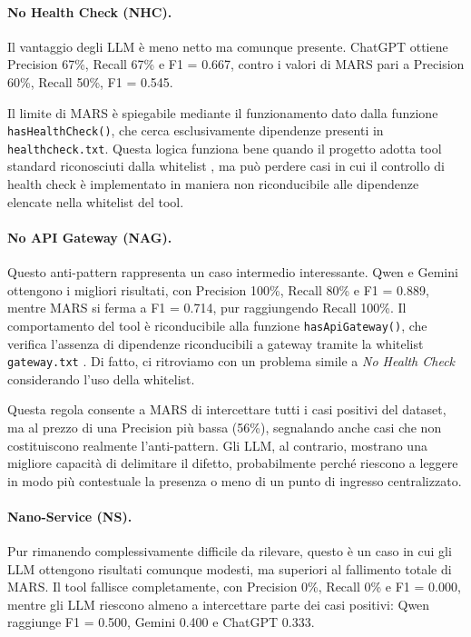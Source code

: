 \paragraph{No Health Check (NHC).}
Il vantaggio degli LLM è meno netto ma comunque presente. ChatGPT ottiene Precision 67\%, Recall 67\% e F1 = 0.667, contro i valori di MARS pari a Precision 60\%, Recall 50\%, F1 = 0.545. 

Il limite di MARS è spiegabile mediante il funzionamento dato dalla funzione \texttt{hasHealthCheck()}, che cerca esclusivamente dipendenze presenti in \texttt{healthcheck.txt}. Questa logica funziona bene quando il progetto adotta tool standard riconosciuti dalla whitelist \cite{MARS, madern2024_mars}, ma può perdere casi in cui il controllo di health check è implementato in maniera non riconducibile alle dipendenze elencate nella whitelist del tool.

\paragraph{No API Gateway (NAG).}
Questo anti-pattern rappresenta un caso intermedio interessante. Qwen e Gemini ottengono i migliori risultati, con Precision 100\%, Recall 80\% e F1 = 0.889, mentre MARS si ferma a F1 = 0.714, pur raggiungendo Recall 100\%. Il comportamento del tool è riconducibile alla funzione \texttt{hasApiGateway()}, che verifica l’assenza di dipendenze riconducibili a gateway tramite la whitelist \texttt{gateway.txt} \cite{MARS, madern2024_mars}. 
Di fatto, ci ritroviamo con un problema simile a \textit{No Health Check} considerando l'uso della whitelist.

Questa regola consente a MARS di intercettare tutti i casi positivi del dataset, ma al prezzo di una Precision più bassa (56\%), segnalando anche casi che non costituiscono realmente l’anti-pattern. Gli LLM, al contrario, mostrano una migliore capacità di delimitare il difetto, probabilmente perché riescono a leggere in modo più contestuale la presenza o meno di un punto di ingresso centralizzato.

\paragraph{Nano-Service (NS).}
Pur rimanendo complessivamente difficile da rilevare, questo è un caso in cui gli LLM ottengono risultati comunque modesti, ma superiori al fallimento totale di MARS. Il tool fallisce completamente, con Precision 0\%, Recall 0\% e F1 = 0.000, mentre gli LLM riescono almeno a intercettare parte dei casi positivi: Qwen raggiunge F1 = 0.500, Gemini 0.400 e ChatGPT 0.333. 

